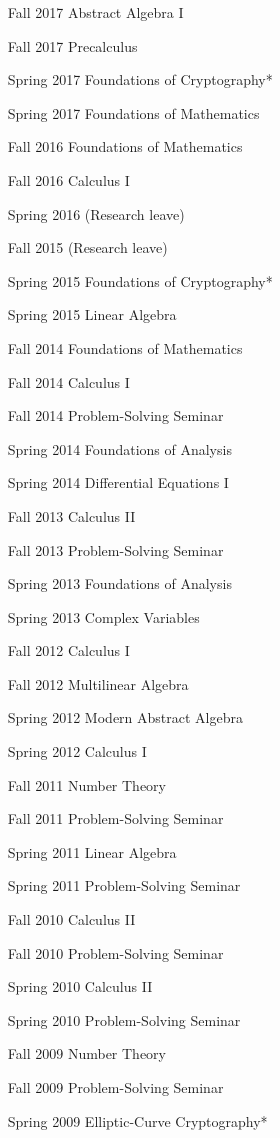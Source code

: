 \documentclass[11pt,a4paper,ragged2e,withhyper]{altacv}
\begin{document}
\begin{multicols}{2}
\begin{enumerate}[labelindent=0pt,labelwidth=2cm,leftmargin=!]
\item[Fall 2017] Abstract Algebra I
\item[Fall 2017] Precalculus
\item[Spring 2017] Foundations of Cryptography*
\item[Spring 2017] Foundations of Mathematics
\item[Fall 2016] Foundations of Mathematics
\item[Fall 2016] Calculus I
\item[Spring 2016] (Research leave)
\item[Fall 2015] (Research leave)
\item[Spring 2015] Foundations of Cryptography*
\item[Spring 2015] Linear Algebra
\item[Fall 2014] Foundations of Mathematics
\item[Fall 2014] Calculus I
\item[Fall 2014] Problem-Solving Seminar
\item[Spring 2014] Foundations of Analysis
\item[Spring 2014] Differential Equations I
\item[Fall 2013] Calculus II
\item[Fall 2013] Problem-Solving Seminar
\item[Spring 2013] Foundations of Analysis
\item[Spring 2013] Complex Variables
\item[Fall 2012] Calculus I
\item[Fall 2012] Multilinear Algebra
\item[Spring 2012] Modern Abstract Algebra
\item[Spring 2012] Calculus I
\item[Fall 2011] Number Theory
\item[Fall 2011] Problem-Solving Seminar
\item[Spring 2011] Linear Algebra
\item[Spring 2011] Problem-Solving Seminar
\item[Fall 2010] Calculus II
\item[Fall 2010] Problem-Solving Seminar
\item[Spring 2010] Calculus II
\item[Spring 2010] Problem-Solving Seminar
\item[Fall 2009] Number Theory
\item[Fall 2009] Problem-Solving Seminar
\item[Spring 2009] Elliptic-Curve Cryptography*

\end{enumerate}
\end{multicols}
\end{document}
